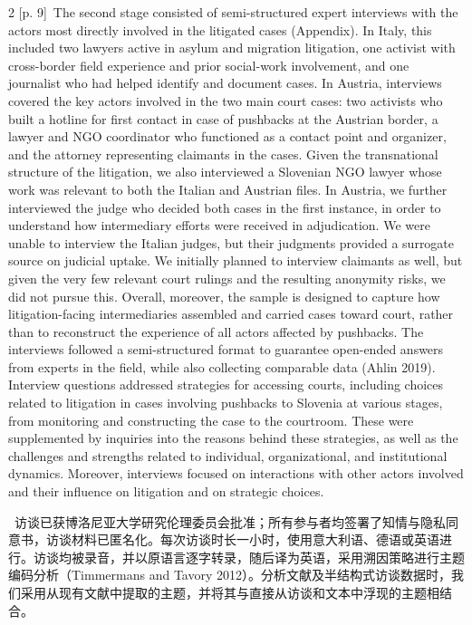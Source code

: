\documentclass[10pt,a4paper]{article}
\begin{document}
\begin{paracol}{2}
\switchcolumn
{\scriptsize\color{gray} [p. 9]}\ The second stage consisted of semi-structured expert interviews with the actors most directly involved in the litigated cases (Appendix). In Italy, this included two lawyers active in asylum and migration litigation, one activist with cross-border field experience and prior social-work involvement, and one journalist who had helped identify and document cases. In Austria, interviews covered the key actors involved in the two main court cases: two activists who built a hotline for first contact in case of pushbacks at the Austrian border, a lawyer and NGO coordinator who functioned as a contact point and organizer, and the attorney representing claimants in the cases. Given the transnational structure of the litigation, we also interviewed a Slovenian NGO lawyer whose work was relevant to both the Italian and Austrian files. In Austria, we further interviewed the judge who decided both cases in the first instance, in order to understand how intermediary efforts were received in adjudication. We were unable to interview the Italian judges, but their judgments provided a surrogate source on judicial uptake. We initially planned to interview claimants as well, but given the very few relevant court rulings and the resulting anonymity risks, we did not pursue this. Overall, moreover, the sample is designed to capture how litigation-facing intermediaries assembled and carried cases toward court, rather than to reconstruct the experience of all actors affected by pushbacks. The interviews followed a semi-structured format to guarantee open-ended answers from experts in the field, while also collecting comparable data (Ahlin 2019). Interview questions addressed strategies for accessing courts, including choices related to litigation in cases involving pushbacks to Slovenia at various stages, from monitoring and constructing the case to the courtroom. These were supplemented by inquiries into the reasons behind these strategies, as well as the challenges and strengths related to individual, organizational, and institutional dynamics. Moreover, interviews focused on interactions with other actors involved and their influence on litigation and on strategic choices.\par
\switchcolumn*
{\scriptsize\color{gray} [p. 10]}\ 访谈已获博洛尼亚大学研究伦理委员会批准；所有参与者均签署了知情与隐私同意书，访谈材料已匿名化。每次访谈时长一小时，使用意大利语、德语或英语进行。访谈均被录音，并以原语言逐字转录，随后译为英语，采用溯因策略进行主题编码分析（Timmermans and Tavory 2012）。分析文献及半结构式访谈数据时，我们采用从现有文献中提取的主题，并将其与直接从访谈和文本中浮现的主题相结合。\par

\end{paracol}
\end{document}
